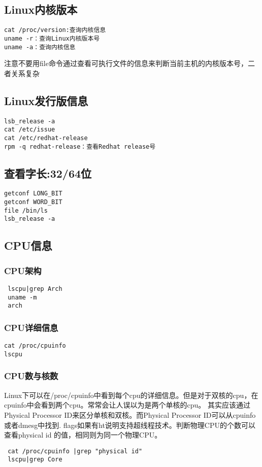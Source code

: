 \subsection{Linux内核版本}
\begin{verbatim}
cat /proc/version:查询内核信息
uname -r：查询Linux内核版本号
uname -a：查询内核信息
\end{verbatim}
注意不要用file命令通过查看可执行文件的信息来判断当前主机的内核版本号，二者关系复杂

\subsection*{Linux发行版信息}
\begin{verbatim}
lsb_release -a 
cat /etc/issue
cat /etc/redhat-release
rpm -q redhat-release：查看Redhat release号
\end{verbatim}

\subsection*{查看字长:32/64位}
\begin{verbatim}
getconf LONG_BIT
getconf WORD_BIT
file /bin/ls
lsb_release -a
\end{verbatim}

\subsection*{CPU信息}
\subsubsection{CPU架构}
\begin{verbatim}
 lscpu|grep Arch
 uname -m
 arch
\end{verbatim}

\subsubsection*{CPU详细信息}
\begin{verbatim}
cat /proc/cpuinfo
lscpu
\end{verbatim}

\subsubsection*{CPU数与核数}
Linux下可以在/proc/cpuinfo中看到每个cpu的详细信息。但是对于双核的cpu，在cpuinfo中会看到两个cpu。常常会让人误以为是两个单核的cpu。
其实应该通过Physical Processor ID来区分单核和双核。而Physical Processor ID可以从cpuinfo或者dmesg中找到.
flags如果有ht说明支持超线程技术。判断物理CPU的个数可以查看physical id 的值，相同则为同一个物理CPU。
\begin{verbatim}
 cat /proc/cpuinfo |grep "physical id"
 lscpu|grep Core
\end{verbatim}

